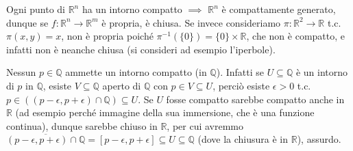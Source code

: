 \begin{ex}
  Ogni punto di $\mathbb{R}^n$ ha un intorno compatto $\implies$ $\mathbb{R}^n$ è compattamente generato, dunque se $f:\mathbb{R}^n \rightarrow \mathbb{R}^m$ è propria, è chiusa.
  Se invece consideriamo $\pi: \mathbb{R}^2 \rightarrow \mathbb{R}$ t.c. $\pi(x, y)=x$, non è propria poiché $\pi^{-1}(\{0\})=\{0\} \times \mathbb{R}$, che non è compatto, e infatti non è neanche chiusa (si consideri ad esempio l'iperbole).
\end{ex}

\begin{ex}
  Nessun $p \in \mathbb{Q}$ ammette un intorno compatto (in $\mathbb{Q}$). Infatti se $U \subseteq \mathbb{Q}$ è un intorno di $p$ in $\mathbb{Q}$, esiste $V \subseteq \mathbb{Q}$ aperto di $\mathbb{Q}$ con $p \in V \subseteq U$,
  perciò esiste $\epsilon>0$ t.c. $p \in ((p-\epsilon, p+\epsilon) \cap \mathbb{Q}) \subseteq U$. Se $U$ fosse compatto sarebbe compatto anche in $\mathbb{R}$ (ad esempio perché immagine della sua immersione, che è una funzione continua), dunque sarebbe chiuso in $\mathbb{R}$,
  per cui avremmo $\overline{(p-\epsilon, p+\epsilon) \cap \mathbb{Q}}=[p-\epsilon, p+\epsilon] \subseteq U \subseteq \mathbb{Q}$ (dove la chiusura è in $\mathbb{R}$), assurdo.
\end{ex}
